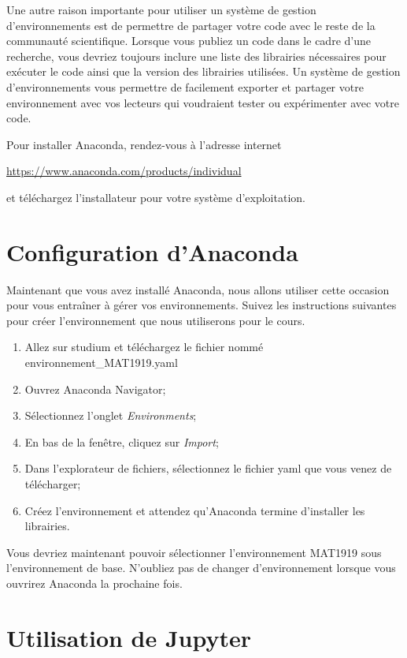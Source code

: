 \documentclass{article}
\begin{document}
Une autre raison importante pour utiliser un système de gestion d'environnements est de permettre de partager votre code avec le reste de la communauté scientifique. Lorsque vous publiez un code dans le cadre d'une recherche, vous devriez toujours inclure une liste des librairies nécessaires pour exécuter le code ainsi que la version des librairies utilisées. Un système de gestion d'environnements vous permettre de facilement exporter et partager votre environnement avec vos lecteurs qui voudraient tester ou expérimenter avec votre code.

Pour installer Anaconda, rendez-vous à l'adresse internet

\noindent \href{https://www.anaconda.com/products/individual}{https://www.anaconda.com/products/individual}

\noindent et téléchargez l'installateur pour votre système d'exploitation.

\section{Configuration d'Anaconda}

Maintenant que vous avez installé Anaconda, nous allons utiliser cette occasion pour vous entraîner à gérer vos environnements. Suivez les instructions suivantes pour créer l'environnement que nous utiliserons pour le cours.
\begin{enumerate}
    \item Allez sur studium et téléchargez le fichier nommé environnement\_MAT1919.yaml
    \item Ouvrez Anaconda Navigator;
    \item Sélectionnez l'onglet \emph{Environments};
    \item En bas de la fenêtre, cliquez sur \emph{Import};
    \item Dans l'explorateur de fichiers, sélectionnez le fichier yaml que vous venez de télécharger;
    \item Créez l'environnement et attendez qu'Anaconda termine d'installer les librairies.
\end{enumerate}

Vous devriez maintenant pouvoir sélectionner l'environnement MAT1919 sous l'environnement de base. N'oubliez pas de changer d'environnement lorsque vous ouvrirez Anaconda la prochaine fois.

\section{Utilisation de Jupyter}
\end{document}
